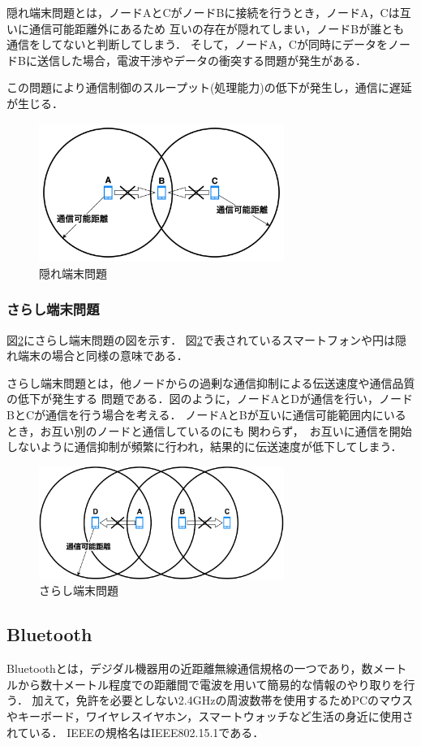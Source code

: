 \documentclass[a4paper, 11pt]{ltjsarticle}
\begin{document}
隠れ端末問題とは，ノードAとCがノードBに接続を行うとき，ノードA，Cは互いに通信可能距離外にあるため
互いの存在が隠れてしまい，ノードBが誰とも通信をしてないと判断してしまう．
そして，ノードA，Cが同時にデータをノードBに送信した場合，電波干渉やデータの衝突する問題が発生がある．

この問題により通信制御のスループット(処理能力)の低下が発生し，通信に遅延が生じる．
\begin{figure}[h]
  \centering
  \includegraphics[width=80mm]{hidden_terminal_problem.png}
  \caption{隠れ端末問題}
  \label{hidden_problem}
\end{figure}

\subsubsection{さらし端末問題}
図\ref{exposed_problem}にさらし端末問題の図を示す．
図\ref{exposed_problem}で表されているスマートフォンや円は隠れ端末の場合と同様の意味である．

さらし端末問題とは，他ノードからの過剰な通信抑制による伝送速度や通信品質の低下が発生する
問題である．図のように，ノードAとDが通信を行い，ノードBとCが通信を行う場合を考える．
ノードAとBが互いに通信可能範囲内にいるとき，お互い別のノードと通信しているのにも
関わらず，　お互いに通信を開始しないように通信抑制が頻繁に行われ，結果的に伝送速度が低下してしまう．

\begin{figure}[h]
  \centering
  \includegraphics[width=80mm]{Exposed_terminal_problem.pdf}
  \caption{さらし端末問題}
  \label{exposed_problem}
\end{figure}

\subsection{Bluetooth}
Bluetoothとは，デジダル機器用の近距離無線通信規格の一つであり，数メートルから数十メートル程度での距離間で電波を用いて簡易的な情報のやり取りを行う．
加えて，免許を必要としない2.4GHzの周波数帯を使用するためPCのマウスやキーボード，ワイヤレスイヤホン，スマートウォッチなど生活の身近に使用されている．
IEEEの規格名はIEEE802.15.1である．
\end{document}
